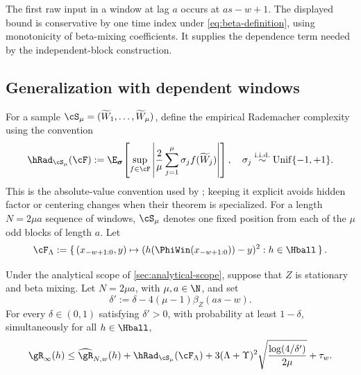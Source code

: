 The first raw input in a window at lag \(a\) occurs at \(as-w+1\). The displayed
bound is conservative by one time index under \cref{eq:beta-definition}, using
monotonicity of beta-mixing coefficients. It supplies the dependence term
needed by the independent-block construction.

\subsection{Generalization with dependent windows}

For a sample \(\cS_\mu=(\widetilde W_1,\ldots,\widetilde W_\mu)\), define the
empirical Rademacher complexity using the convention
\begin{equation}
    \hRad_{\cS_\mu}(\cF)
    :=
    \E_{\bm\sigma}\!\left[
      \sup_{f\in\cF}
      \abs{\frac2\mu\sum_{j=1}^\mu\sigma_j f(\widetilde W_j)}
    \right],
    \quad
    \sigma_j\overset{\mathrm{i.i.d.}}{\sim}\mathrm{Unif}\{-1,+1\}.
    \label{eq:rademacher-definition}
\end{equation}
This is the absolute-value convention used by
\citet{MohriRostamizadeh2008}; keeping it explicit avoids hidden factor or
centering changes when their theorem is specialized. For a length
\(N=2\mu a\) sequence of windows, \(\cS_\mu\) denotes one fixed position from
each of the \(\mu\) odd blocks of length \(a\). Let
\[
    \cF_\Lambda
    :=
    \set{
      (x_{-w+1:0},y)
      \mapsto
      (h(\PhiWin(x_{-w+1:0}))-y)^2:
      h\in\Hball
    }.
\]

\begin{theorem}
\label{thm:generalization}
Under the analytical scope of \cref{sec:analytical-scope}, suppose that \(Z\)
is stationary and beta mixing. Let \(N=2\mu a\), with \(\mu,a\in\N\), and set
\begin{equation}
    \delta'
    :=
    \delta-4(\mu-1)\beta_Z(as-w).
    \label{eq:delta-prime}
\end{equation}
For every \(\delta\in(0,1)\) satisfying \(\delta'>0\), with probability at
least \(1-\delta\), simultaneously for all \(h\in\Hball\),
\begin{equation}
    \risk_\infty(h)
    \leq
    \erisk_{N,w}(h)
    +\hRad_{\cS_\mu}(\cF_\Lambda)
    +3(\Lambda+\Upsilon)^2
      \sqrt{\frac{\log(4/\delta')}{2\mu}}
    +\tau_w.
    \label{eq:empirical-rad-bound}
\end{equation}
\end{theorem}

